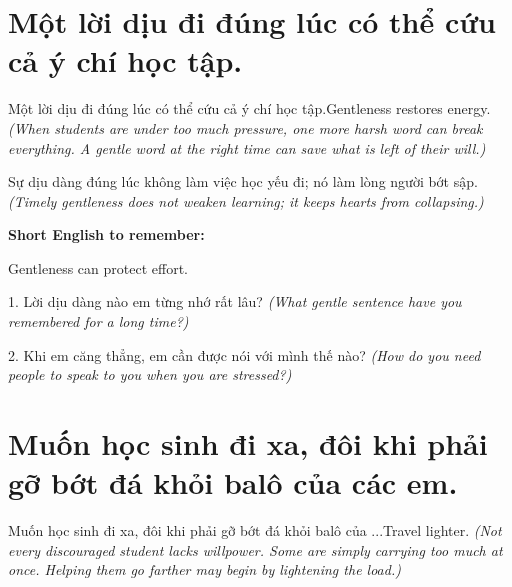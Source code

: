 \section{Một lời dịu đi đúng lúc có thể cứu cả ý chí học tập.}
\begin{truyen}{Một lời dịu đi đúng lúc có thể cứu cả ý chí học tập.}{Gentleness restores energy.}
\textit{(When students are under too much pressure, one more harsh word can break everything. A gentle word at the right time can save what is left of their will.)}
\end{truyen}

\begin{baihoc}
Sự dịu dàng đúng lúc không làm việc học yếu đi; nó làm lòng người bớt sập.
\textit{(Timely gentleness does not weaken learning; it keeps hearts from collapsing.)}
\end{baihoc}

\begin{ghinhoanh}
\textbf{Short English to remember:}

Gentleness can protect effort.

\end{ghinhoanh}

\begin{tuhocnhanh}
1. Lời dịu dàng nào em từng nhớ rất lâu? \textit{(What gentle sentence have you remembered for a long time?)}

2. Khi em căng thẳng, em cần được nói với mình thế nào? \textit{(How do you need people to speak to you when you are stressed?)}
\end{tuhocnhanh}
\ngancach


\section{Muốn học sinh đi xa, đôi khi phải gỡ bớt đá khỏi balô của các em.}
\begin{truyen}{Muốn học sinh đi xa, đôi khi phải gỡ bớt đá khỏi balô của ...}{Travel lighter.}
\textit{(Not every discouraged student lacks willpower. Some are simply carrying too much at once. Helping them go farther may begin by lightening the load.)}
\end{truyen}

